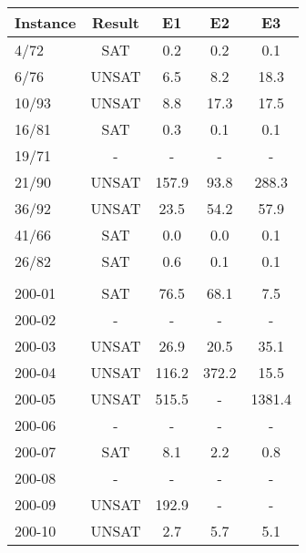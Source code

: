 \begin{tabular}{ lc|ccc }
Instance &Result &E1	    &E2	    &E3 \\
    \hline
4/72	&SAT	&0.2	&0.2	&0.1\\
6/76	&UNSAT	&6.5	&8.2	&18.3\\
10/93	&UNSAT	&8.8	&17.3	&17.5\\
16/81	&SAT	&0.3	&0.1	&0.1\\
19/71	&-	&-	&-	&-\\
21/90	&UNSAT	&157.9	&93.8	&288.3\\
36/92	&UNSAT	&23.5	&54.2	&57.9\\
41/66	&SAT	&0.0	&0.0	&0.1\\
26/82	&SAT	&0.6	&0.1	&0.1\\
 & & & &  \\
200-01	&SAT	&76.5	&68.1	&7.5\\
200-02	&-	&-	&-	&-\\
200-03	&UNSAT	&26.9	&20.5	&35.1\\
200-04	&UNSAT	&116.2	&372.2	&15.5\\
200-05	&UNSAT	&515.5	&-	&1381.4\\
200-06	&-	&-	&-	&-\\
200-07	&SAT	&8.1	&2.2	&0.8\\
200-08	&-	&-	&-	&-\\
200-09	&UNSAT	&192.9	&-	&-\\
200-10	&UNSAT	&2.7	&5.7	&5.1\\
    \hline
\end{tabular}
